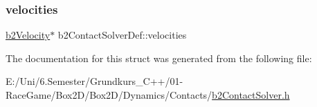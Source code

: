 \mbox{\label{structb2_contact_solver_def_ae839e5c5464aa54c1ad8ce1634b49a1f}} 
\subsubsection{\texorpdfstring{velocities}{velocities}}
{\footnotesize\ttfamily \mbox{\hyperlink{structb2_velocity}{b2\+Velocity}}$\ast$ b2\+Contact\+Solver\+Def\+::velocities}



The documentation for this struct was generated from the following file\+:\begin{DoxyCompactItemize}
\item 
E\+:/\+Uni/6.\+Semester/\+Grundkurs\+\_\+\+C++/01-\/\+Race\+Game/\+Box2\+D/\+Box2\+D/\+Dynamics/\+Contacts/\mbox{\hyperlink{b2_contact_solver_8h}{b2\+Contact\+Solver.\+h}}\end{DoxyCompactItemize}
